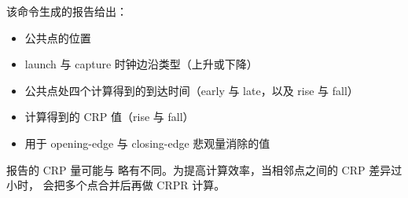 该命令生成的报告给出：
\begin{itemize}
  \item 公共点的位置
  \item launch 与 capture 时钟边沿类型（上升或下降）
  \item 公共点处四个计算得到的到达时间（early 与 late，以及 rise 与 fall）
  \item 计算得到的 CRP 值（rise 与 fall）
  \item 用于 opening-edge 与 closing-edge 悲观量消除的值
\end{itemize}

 报告的 CRP 量可能与  略有不同。为提高计算效率，当相邻点之间的 CRP 差异过小时， 会把多个点合并后再做 CRPR 计算。
